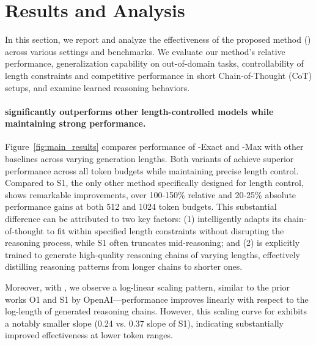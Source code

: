 \section{Results and Analysis}

 

In this section, we report and analyze the effectiveness of the proposed method (\ours{}) across various settings and benchmarks. We evaluate our method's relative performance, generalization capability on out-of-domain tasks, controllability of length constraints and competitive performance in short Chain-of-Thought (CoT) setups, and examine learned reasoning behaviors.


\paragraph{\model{} significantly outperforms other length-controlled models while maintaining strong performance.}


Figure~\ref{fig:main_results} compares performance of \model{}-Exact and \model{}-Max with other baselines across varying generation lengths. Both variants of \model{} achieve superior performance across all token budgets while maintaining precise length control. Compared to S1, the only other method specifically designed for length control, \model{} shows remarkable improvements, over 100-150\% relative and 20-25\% absolute performance gains at both 512 and 1024 token budgets. This substantial difference can be attributed to two key factors: (1) \model{} intelligently adapts its chain-of-thought to fit within specified length constraints without disrupting the reasoning process, while S1 often truncates mid-reasoning; and (2) \model{} is explicitly trained to generate high-quality reasoning chains of varying lengths, effectively distilling reasoning patterns from longer chains to shorter ones.

Moreover, with \model{}, we observe a log-linear scaling pattern, similar to the prior works O1 and S1 by OpenAI—performance improves linearly with respect to the log-length of generated reasoning chains. However, this scaling curve for \model{} exhibits a notably smaller slope (0.24 vs. 0.37 slope of S1), indicating substantially improved effectiveness at lower token ranges. 

